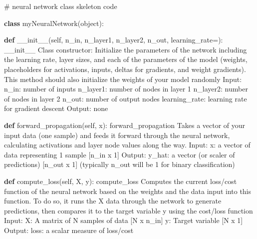 \documentclass[
  letterpaper,
  DIV=11,
  numbers=noendperiod]{scrartcl}
\newenvironment{Shaded}{\begin{snugshade}}{\end{snugshade}}
\newcommand{\BuiltInTok}[1]{\textcolor[rgb]{0.00,0.23,0.31}{#1}}
\newcommand{\CommentTok}[1]{\textcolor[rgb]{0.37,0.37,0.37}{#1}}
\newcommand{\FunctionTok}[1]{\textcolor[rgb]{0.28,0.35,0.67}{#1}}
\newcommand{\KeywordTok}[1]{\textcolor[rgb]{0.00,0.23,0.31}{\textbf{#1}}}
\newcommand{\NormalTok}[1]{\textcolor[rgb]{0.00,0.23,0.31}{#1}}
\newcommand{\OperatorTok}[1]{\textcolor[rgb]{0.37,0.37,0.37}{#1}}
\newcommand{\VariableTok}[1]{\textcolor[rgb]{0.07,0.07,0.07}{#1}}
\begin{document}
\begin{Shaded}
\begin{Highlighting}[]
\CommentTok{\# neural network class skeleton code}

\KeywordTok{class}\NormalTok{ myNeuralNetwork(}\BuiltInTok{object}\NormalTok{):}
    
    \KeywordTok{def} \FunctionTok{\_\_init\_\_}\NormalTok{(}\VariableTok{self}\NormalTok{, n\_in, n\_layer1, n\_layer2, n\_out, learning\_rate}\OperatorTok{=}\NormalTok{):}
        \CommentTok{\textquotesingle{}\textquotesingle{}\textquotesingle{}\_\_init\_\_}
\CommentTok{        Class constructor: Initialize the parameters of the network including}
\CommentTok{        the learning rate, layer sizes, and each of the parameters}
\CommentTok{        of the model (weights, placeholders for activations, inputs, }
\CommentTok{        deltas for gradients, and weight gradients). This method}
\CommentTok{        should also initialize the weights of your model randomly}
\CommentTok{            Input:}
\CommentTok{                n\_in:          number of inputs}
\CommentTok{                n\_layer1:      number of nodes in layer 1}
\CommentTok{                n\_layer2:      number of nodes in layer 2}
\CommentTok{                n\_out:         number of output nodes}
\CommentTok{                learning\_rate: learning rate for gradient descent}
\CommentTok{            Output:}
\CommentTok{                none}
\CommentTok{        \textquotesingle{}\textquotesingle{}\textquotesingle{}}
            
    \KeywordTok{def}\NormalTok{ forward\_propagation(}\VariableTok{self}\NormalTok{, x):}
        \CommentTok{\textquotesingle{}\textquotesingle{}\textquotesingle{}forward\_propagation}
\CommentTok{        Takes a vector of your input data (one sample) and feeds}
\CommentTok{        it forward through the neural network, calculating activations and}
\CommentTok{        layer node values along the way.}
\CommentTok{            Input:}
\CommentTok{                x: a vector of data representing 1 sample [n\_in x 1]}
\CommentTok{            Output:}
\CommentTok{                y\_hat: a vector (or scaler of predictions) [n\_out x 1]}
\CommentTok{                (typically n\_out will be 1 for binary classification)}
\CommentTok{        \textquotesingle{}\textquotesingle{}\textquotesingle{}}
    
    \KeywordTok{def}\NormalTok{ compute\_loss(}\VariableTok{self}\NormalTok{, X, y):}
        \CommentTok{\textquotesingle{}\textquotesingle{}\textquotesingle{}compute\_loss}
\CommentTok{        Computes the current loss/cost function of the neural network}
\CommentTok{        based on the weights and the data input into this function.}
\CommentTok{        To do so, it runs the X data through the network to generate}
\CommentTok{        predictions, then compares it to the target variable y using}
\CommentTok{        the cost/loss function}
\CommentTok{            Input:}
\CommentTok{                X: A matrix of N samples of data [N x n\_in]}
\CommentTok{                y: Target variable [N x 1]}
\CommentTok{            Output:}
\CommentTok{                loss: a scalar measure of loss/cost}
\CommentTok{        \textquotesingle{}\textquotesingle{}\textquotesingle{}}
    

\end{Highlighting}
\end{Shaded}
\end{document}
